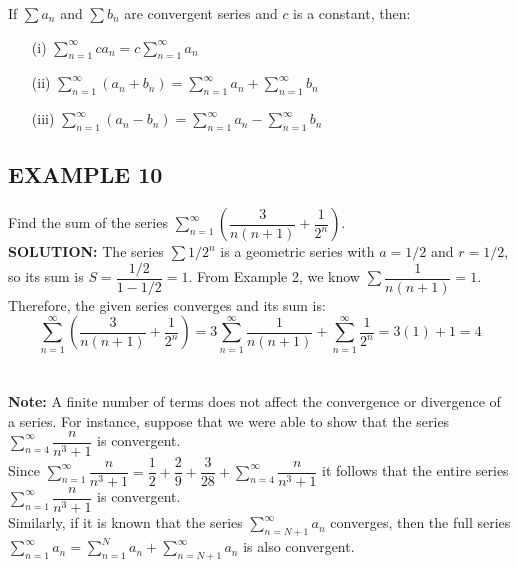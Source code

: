 \documentclass{article}
\begin{document}
\begin{tcolorbox}[
    colback=white,
    colframe=orange!80!white,
    title=Properties of Convergent Series,
    boxrule=0.5mm,
    arc=3mm
    ]
    If \( \sum a_n \) and \( \sum b_n \) are convergent series and \(c\) is a constant, then:
    \begin{itemize}
        \item[(i)] \( \sum_{n=1}^{\infty} c a_n = c \sum_{n=1}^{\infty} a_n \)
        \item[(ii)] \( \sum_{n=1}^{\infty} (a_n + b_n) = \sum_{n=1}^{\infty} a_n + \sum_{n=1}^{\infty} b_n \)
        \item[(iii)] \( \sum_{n=1}^{\infty} (a_n - b_n) = \sum_{n=1}^{\infty} a_n - \sum_{n=1}^{\infty} b_n \)
    \end{itemize}
\end{tcolorbox}

\subsection*{EXAMPLE 10}
Find the sum of the series \( \sum_{n=1}^{\infty} \left( \dfrac{3}{n(n+1)} + \dfrac{1}{2^n} \right) \).\\
\textbf{SOLUTION:}
The series \( \sum 1/2^n \) is a geometric series with \(a=1/2\) and \(r=1/2\), so its sum is \( S = \dfrac{1/2}{1-1/2} = 1 \).
From Example 2, we know \( \sum \dfrac{1}{n(n+1)} = 1 \).
Therefore, the given series converges and its sum is:
\[ \sum_{n=1}^{\infty} \left( \dfrac{3}{n(n+1)} + \dfrac{1}{2^n} \right) = 3 \sum_{n=1}^{\infty} \dfrac{1}{n(n+1)} + \sum_{n=1}^{\infty} \dfrac{1}{2^n} = 3(1) + 1 = 4 \]\\\\

\textbf{Note:}
A finite number of terms does not affect the convergence or divergence of a series. For instance, suppose that we were able to show that the series
$\sum_{n=4}^{\infty} \dfrac{n}{n^3 + 1} $
is convergent. \\
Since $\sum_{n=1}^{\infty} \dfrac{n}{n^3 + 1} = \dfrac{1}{2} + \dfrac{2}{9} + \dfrac{3}{28} + \sum_{n=4}^{\infty} \dfrac{n}{n^3 + 1}$
it follows that the entire series \( \sum_{n=1}^{\infty} \dfrac{n}{n^3 + 1} \) is convergent.\\
Similarly, if it is known that the series \( \sum_{n=N+1}^{\infty} a_n \) converges, then the full series
$\sum_{n=1}^{\infty} a_n = \sum_{n=1}^{N} a_n + \sum_{n=N+1}^{\infty} a_n $
is also convergent.
\end{document}

